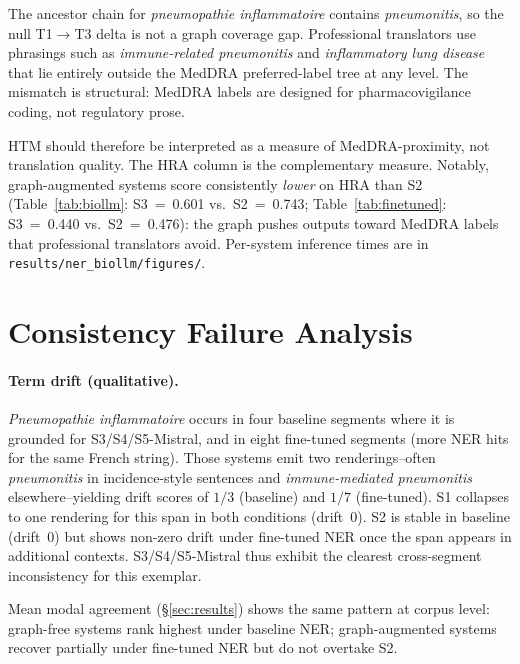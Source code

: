 \documentclass[11pt,a4paper,twocolumn]{article}
\begin{document}
\begin{finding}
The ancestor chain for \textit{pneumopathie inflammatoire} contains
\textit{pneumonitis}, so the null T1$\to$T3 delta is not a graph coverage
gap. Professional translators use phrasings such as \textit{immune-related
pneumonitis} and \textit{inflammatory lung disease} that lie entirely outside
the MedDRA preferred-label tree at any level. The mismatch is structural:
MedDRA labels are designed for pharmacovigilance coding, not regulatory prose.
\end{finding}

HTM should therefore be interpreted as a measure of MedDRA-proximity, not
translation quality. The HRA column is the complementary measure. Notably,
graph-augmented systems score consistently \emph{lower} on HRA than S2
(Table~\ref{tab:biollm}: S3~=~0.601 vs.\ S2~=~0.743;
Table~\ref{tab:finetuned}: S3~=~0.440 vs.\ S2~=~0.476): the graph pushes
outputs toward MedDRA labels that professional translators avoid.
Per-system inference times are in \texttt{results/ner\_biollm/figures/}.

\section{Consistency Failure Analysis}
\label{sec:consistency}

\paragraph{Term drift (qualitative).}
\textit{Pneumopathie inflammatoire} occurs in four baseline segments where it
is grounded for S3/S4/S5-Mistral, and in eight fine-tuned segments (more NER
hits for the same French string). Those systems emit two renderings--often
\textit{pneumonitis} in incidence-style sentences and \textit{immune-mediated
pneumonitis} elsewhere--yielding drift scores of $1/3$ (baseline) and $1/7$
(fine-tuned). S1 collapses to one rendering for this span in both conditions
(drift~0). S2 is stable in baseline (drift~0) but shows non-zero drift under
fine-tuned NER once the span appears in additional contexts. S3/S4/S5-Mistral
thus exhibit the clearest cross-segment inconsistency for this exemplar.

Mean modal agreement (\S\ref{sec:results}) shows the same pattern at corpus
level: graph-free systems rank highest under baseline NER; graph-augmented
systems recover partially under fine-tuned NER but do not overtake S2.
\end{document}
